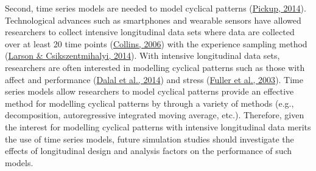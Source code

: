 \documentclass[
12pt, %
twoside,
english]{guelphthesis}
\begin{document}
Second, time series models are needed to model cyclical patterns (\protect\hyperlink{ref-pickup2014}{Pickup, 2014}). Technological advances such as smartphones and wearable sensors have allowed researchers to collect intensive longitudinal data sets where data are collected over at least 20 time points (\protect\hyperlink{ref-collins2006}{Collins, 2006}) with the experience sampling method (\protect\hyperlink{ref-larson2014}{Larson \& Csikszentmihalyi, 2014}). With intensive longitudinal data sets, researchers are often interested in modelling cyclical patterns such as those with affect and performance (\protect\hyperlink{ref-dalal2014}{Dalal et al., 2014}) and stress (\protect\hyperlink{ref-fuller2003}{Fuller et al., 2003}). Time series models allow researchers to model cyclical patterns provide an effective method for modelling cyclical patterns by through a variety of methods (e.g., decomposition, autoregressive integrated moving average, etc.). Therefore, given the interest for modelling cyclical patterns with intensive longitudinal data merits the use of time series models, future simulation studies should investigate the effects of longitudinal design and analysis factors on the performance of such models.
\end{document}
